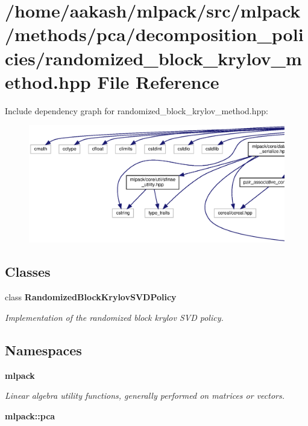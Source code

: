 \section{/home/aakash/mlpack/src/mlpack/methods/pca/decomposition\+\_\+policies/randomized\+\_\+block\+\_\+krylov\+\_\+method.hpp File Reference}
\label{randomized__block__krylov__method_8hpp}
Include dependency graph for randomized\+\_\+block\+\_\+krylov\+\_\+method.\+hpp\+:
\nopagebreak
\begin{figure}[H]
\begin{center}
\leavevmode
\includegraphics[width=350pt]{randomized__block__krylov__method_8hpp__incl}
\end{center}
\end{figure}
\subsection*{Classes}
\begin{DoxyCompactItemize}
\item 
class \textbf{ Randomized\+Block\+Krylov\+S\+V\+D\+Policy}
\begin{DoxyCompactList}\small\item\em Implementation of the randomized block krylov S\+VD policy. \end{DoxyCompactList}\end{DoxyCompactItemize}
\subsection*{Namespaces}
\begin{DoxyCompactItemize}
\item 
 \textbf{ mlpack}
\begin{DoxyCompactList}\small\item\em Linear algebra utility functions, generally performed on matrices or vectors. \end{DoxyCompactList}\item 
 \textbf{ mlpack\+::pca}
\end{DoxyCompactItemize}



